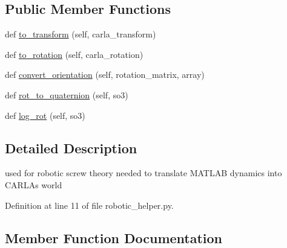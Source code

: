 \subsection*{Public Member Functions}
\begin{DoxyCompactItemize}
\item 
def \hyperlink{classscripts_1_1osu__modules_1_1tools_1_1robotic__helper_1_1RoboticHelper_a4e20b6e0ee95e19dfffd04f8124bc8c0}{to\+\_\+transform} (self, carla\+\_\+transform)
\item 
def \hyperlink{classscripts_1_1osu__modules_1_1tools_1_1robotic__helper_1_1RoboticHelper_ae2dc6a39a8f3b333702d1332b3762cde}{to\+\_\+rotation} (self, carla\+\_\+rotation)
\item 
def \hyperlink{classscripts_1_1osu__modules_1_1tools_1_1robotic__helper_1_1RoboticHelper_ac08b92ddd486443ed8443b92f4934dd0}{convert\+\_\+orientation} (self, rotation\+\_\+matrix, array)
\item 
def \hyperlink{classscripts_1_1osu__modules_1_1tools_1_1robotic__helper_1_1RoboticHelper_a8dda48f4779a58ccfad6761753a7fcda}{rot\+\_\+to\+\_\+quaternion} (self, so3)
\item 
def \hyperlink{classscripts_1_1osu__modules_1_1tools_1_1robotic__helper_1_1RoboticHelper_a81792910e5b298b065ebc261f21f391b}{log\+\_\+rot} (self, so3)
\end{DoxyCompactItemize}


\subsection{Detailed Description}
\begin{DoxyVerb}used for robotic screw theory needed to translate
    MATLAB dynamics into CARLAs world
\end{DoxyVerb}
 

Definition at line 11 of file robotic\+\_\+helper.\+py.



\subsection{Member Function Documentation}
\mbox{\label{classscripts_1_1osu__modules_1_1tools_1_1robotic__helper_1_1RoboticHelper_ac08b92ddd486443ed8443b92f4934dd0}} 

